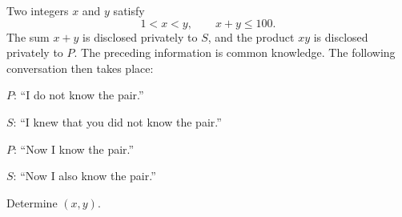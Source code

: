 
    \begin{expectedproblem}
        Two integers $x$ and $y$ satisfy
        \[
            1<x<y,
            \qquad
            x+y\leq100.
        \]
        The sum $x+y$ is disclosed privately to $S$, and the product $xy$ is
        disclosed privately to $P$. The preceding information is common
        knowledge. The following conversation then takes place:
        \begin{problemchoices}
            \item $P$: ``I do not know the pair.''
            \item $S$: ``I knew that you did not know the pair.''
            \item $P$: ``Now I know the pair.''
            \item $S$: ``Now I also know the pair.''
        \end{problemchoices}
        Determine $(x,y)$.
    \end{expectedproblem}

